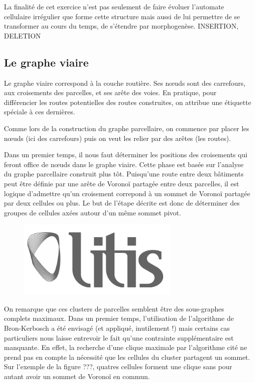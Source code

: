 \documentclass[12pt]{article}
\begin{document}
La finalité de cet exercice n'est pas seulement de faire évoluer
l'automate cellulaire irrégulier que forme cette structure mais aussi
de lui permettre de se transformer au cours du temps, de s'étendre par
morphogenèse. INSERTION, DELETION

\subsection{Le graphe viaire}

Le graphe viaire correspond à la couche routière. Ses n\oe uds sont
des carrefours, aux croisements des parcelles, et ses arête des
voies. En pratique, pour différencier les routes potentielles des
routes construites, on attribue une étiquette spéciale à ces
dernières.

Comme lors de la construction du graphe parcellaire, on commence par
placer les n\oe uds (ici des carrefours) puis on veut les relier par
des arêtes (les routes).

Dans un premier temps, il nous faut déterminer les positions des
croisements qui feront office de n\oe uds dans le graphe viaire. Cette
phase est basée sur l'analyse du graphe parcellaire construit plus
tôt. Puisqu'une route entre deux bâtiments peut être définie par une
arête de Voronoï partagée entre deux parcelles, il est logique
d'admettre qu'un croisement correpond à un sommet de Voronoï partagée
par deux cellules ou plus. Le but de l'étape décrite est donc de
déterminer des groupes de cellules axées autour d'un même sommet
pivot.

\begin{figure}
  \centering
  \includegraphics[width=.6\linewidth]{images/logo-litis.png}
  \caption{}
  \label{fig:construction-viaire1}
\end{figure}

On remarque que ces clusters de parcelles semblent être des
sous-graphes complets maximaux. Dans un premier temps, l'utilisation
de l'algorithme de Bron-Kerbosch a été envisagé (et appliqué,
inutilement !) mais certains cas particuliers nous laisse entrevoir
le fait qu'une contrainte supplémentaire est manquante. En effet, la
recherche d'une clique maximale par l'algorithme cité ne prend pas en
compte la nécessité que les cellules du cluster partagent un
sommet. Sur l'exemple de la figure ???, quatres cellules forment une
clique sans pour autant avoir un sommet de Voronoï en commun.
\end{document}
